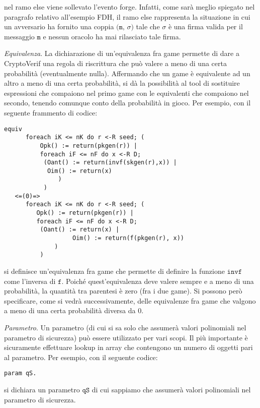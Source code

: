 \documentclass[a4paper,openright,twoside,12pt]{report}
\begin{document}
\begin{description}
\begin{verbatim}
				      \end{verbatim}
nel ramo else viene sollevato l'evento forge. Infatti, come sar\`a meglio spiegato nel paragrafo relativo all'esempio FDH, il ramo else rappresenta la situazione in cui un avversario ha fornito
una coppia $\texttt{(m,} $ $\sigma \texttt{)}$ tale che $\sigma$ \`e una firma valida per il messaggio $\texttt{m}$ e nessun oracolo ha mai rilasciato tale firma.
 \item{\emph{Equivalenza}.} La dichiarazione di un'equivalenza fra game permette di dare a CryptoVerif una regola di riscrittura che pu\`o valere
		    a meno di una certa probabilit\`a (eventualmente nulla). Affermando che un game \`e equivalente ad un altro a meno di una certa probabilit\`a, 
		    si d\`a la possibilit\`a al tool di sostituire espressioni che compaiono nel primo game con le equivalenti che compaiono nel secondo, 
tenendo comunque conto della probabilit\`a in gioco.
Per esempio, con il seguente frammento di codice:
\newpage
\begin{verbatim}
equiv 
      foreach iK <= nK do r <-R seed; (
          Opk() := return(pkgen(r)) |
          foreach iF <= nF do x <-R D;
           (Oant() := return(invf(skgen(r),x)) |
            Oim() := return(x)
               )
           )
   <=(0)=>
      foreach iK <= nK do r <-R seed; (
         Opk() := return(pkgen(r)) |
         foreach iF <= nF do x <-R D;
          (Oant() := return(x) |
                   Oim() := return(f(pkgen(r), x))
              )
          )
 \end{verbatim}
si definisce un'equivalenza fra game che permette di definire la funzione $\texttt{invf}$ come l'inversa di $\texttt{f}$. Poich\'e quest'equivalenza deve valere sempre e a meno di una probabilit\`a,
la quantit\`a tra parentesi \`e zero (fra i due game). Si possono per\`o specificare, come si vedr\`a successivamente, delle equivalenze fra game che valgono a meno di una certa probabilit\`a diversa da 0.
 \item{\emph{Parametro}.} Un parametro (di cui si sa solo che assumer\`a valori polinomiali nel parametro di sicurezza) pu\`o essere utilizzato per vari scopi.
		  Il pi\`u importante \`e sicuramente effettuare lookup in array che contengono un numero di oggetti pari al parametro.
Per esempio, con il seguente codice:
\begin{verbatim}
param qS.
\end{verbatim}
si dichiara un parametro $\texttt{qS}$ di cui sappiamo che assumer\`a valori polinomiali nel parametro di sicurezza.	    

\end{description}
\end{document}
